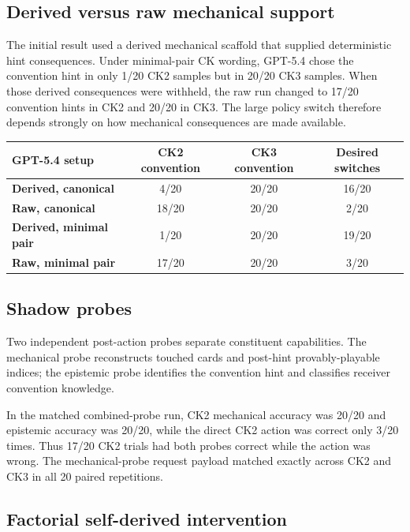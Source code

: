 \documentclass[11pt,a4paper]{article}
\begin{document}
\subsection{Derived versus raw mechanical support}

The initial result used a derived mechanical scaffold that supplied deterministic
hint consequences. Under minimal-pair CK wording, GPT-5.4 chose the convention
hint in only 1/20 CK2 samples but in 20/20 CK3 samples. When those derived
consequences were withheld, the raw run changed to 17/20 convention hints in CK2
and 20/20 in CK3. The large policy switch therefore depends strongly on how
mechanical consequences are made available.

\begin{table}[H]
\centering
\small
\begin{tabularx}{\textwidth}{>{\bfseries}p{34mm}CCC}
\toprule
GPT-5.4 setup & CK2 convention & CK3 convention & Desired switches \\
\midrule
Derived, canonical & 4/20 & 20/20 & 16/20 \\
Raw, canonical & 18/20 & 20/20 & 2/20 \\
Derived, minimal pair & 1/20 & 20/20 & 19/20 \\
Raw, minimal pair & 17/20 & 20/20 & 3/20 \\
\bottomrule
\end{tabularx}
\end{table}

\subsection{Shadow probes}

Two independent post-action probes separate constituent capabilities. The
mechanical probe reconstructs touched cards and post-hint provably-playable
indices; the epistemic probe identifies the convention hint and classifies
receiver convention knowledge.

In the matched combined-probe run, CK2 mechanical accuracy was 20/20 and
epistemic accuracy was 20/20, while the direct CK2 action was correct only 3/20
times. Thus 17/20 CK2 trials had both probes correct while the action was wrong.
The mechanical-probe request payload matched exactly across CK2 and CK3 in all
20 paired repetitions.

\subsection{Factorial self-derived intervention}
\end{document}
